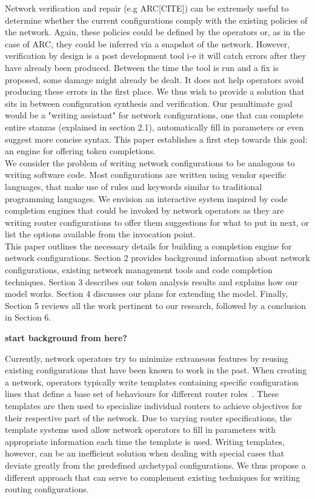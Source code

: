 Network verification and repair (e.g ARC[CITE]) can be extremely useful to determine whether the current configurations comply with the existing policies of the network. Again, these policies could be defined by the operators or, as in the case of ARC, they could be inferred via a snapshot of the network. However, verification by design is a post development tool i-e it will catch errors after they have already been produced. Between the time the tool is run and a fix is proposed, some damage might already be dealt. It does not help operators avoid producing these errors in the first place. We thus wish to provide a solution that sits in between configuration synthesis and verification. Our penultimate goal would be a "writing assistant" for network configurations, one that can complete entire stanzas (explained in section 2.1), automatically fill in parameters or even suggest more concise syntax. This paper establishes a first step towards this goal: an engine for offering token completions.\\

We consider the problem of writing network configurations to be analogous to writing software code. Most configurations are written using vendor specific languages, that make use of rules and keywords similar to traditional programming languages. We envision an interactive system inspired by code completion engines that could be invoked by network operators as they are writing router configurations to offer them suggestions for what to put in next, or list the options available from the invocation point.\\ 

This paper outlines the necessary details for building a completion engine for network configurations. Section 2 provides background information about network configurations, existing network management tools and code completion techniques. Section 3 describes our token analysis results and explains how our model works. Section 4 discusses our plans for extending the model. Finally, Section 5 reviews all the work pertinent to our research, followed by a conclusion in Section 6.

\textbf{start background from here?}

Currently, network operators try to minimize extraneous features by reusing existing configurations that have been known to work in the past. When creating a network, operators typically write templates containing specific configuration lines that define a base set of behaviours for different router roles~\cite{complexity}. These templates are then used to specialize individual routers to achieve objectives for their respective part of the network. Due to varying router specifications, the template systems used allow network operators to fill in parameters with appropriate information each time the template is used. Writing templates, however, can be an inefficient solution when dealing with special cases that deviate greatly from the predefined archetypal configurations. We thus propose a different approach that can serve to complement existing techniques for writing routing configurations.\\ 



